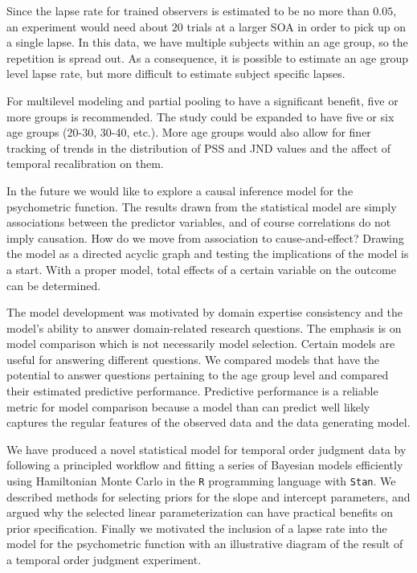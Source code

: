 \documentclass[11pt, oneside, openany]{scrbook}
\begin{document}
Since the lapse rate for trained observers is estimated to be no more than \(0.05\), an experiment would need about \(20\) trials at a larger SOA in order to pick up on a single lapse. In this data, we have multiple subjects within an age group, so the repetition is spread out. As a consequence, it is possible to estimate an age group level lapse rate, but more difficult to estimate subject specific lapses.

For multilevel modeling and partial pooling to have a significant benefit, five or more groups is recommended. The study could be expanded to have five or six age groups (20-30, 30-40, etc.). More age groups would also allow for finer tracking of trends in the distribution of PSS and JND values and the affect of temporal recalibration on them.

In the future we would like to explore a causal inference model for the psychometric function. The results drawn from the statistical model are simply associations between the predictor variables, and of course correlations do not imply causation. How do we move from association to cause-and-effect? Drawing the model as a directed acyclic graph and testing the implications of the model is a start. With a proper model, total effects of a certain variable on the outcome can be determined.

The model development was motivated by domain expertise consistency and the model's ability to answer domain-related research questions. The emphasis is on model comparison which is not necessarily model selection. Certain models are useful for answering different questions. We compared models that have the potential to answer questions pertaining to the age group level and compared their estimated predictive performance. Predictive performance is a reliable metric for model comparison because a model than can predict well likely captures the regular features of the observed data and the data generating model.

We have produced a novel statistical model for temporal order judgment data by following a principled workflow and fitting a series of Bayesian models efficiently using Hamiltonian Monte Carlo in the \texttt{R} programming language with \texttt{Stan}. We described methods for selecting priors for the slope and intercept parameters, and argued why the selected linear parameterization can have practical benefits on prior specification. Finally we motivated the inclusion of a lapse rate into the model for the psychometric function with an illustrative diagram of the result of a temporal order judgment experiment.
\end{document}
